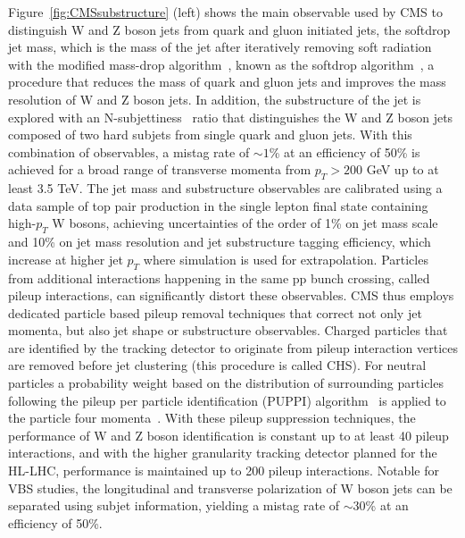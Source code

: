 Figure~\ref{fig:CMSsubstructure} (left) shows the main observable used by CMS to distinguish W and Z boson jets from quark and gluon initiated jets, the softdrop jet mass, which is the mass of the jet after iteratively removing soft radiation with the modified mass-drop algorithm~\cite{Dasgupta:2013ihk,Butterworth:2008iy}, known as the softdrop algorithm~\cite{Larkoski:2014wba}, a procedure that reduces the mass of quark and gluon jets and improves the mass resolution of W and Z boson jets.
In addition, the substructure of the jet is explored with an N-subjettiness~\cite{Thaler:2010tr} ratio that distinguishes the W and Z boson jets composed of two hard subjets from single quark and gluon jets.
With this combination of observables, a mistag rate of $\sim1$\% at an efficiency of 50\% is achieved for a broad range of transverse momenta from $p_T>200$ GeV up to at least 3.5 TeV.
The jet mass and substructure observables are calibrated using a data sample of top pair production in the single lepton final state containing high-$p_T$ W bosons, achieving uncertainties of the order of 1\% on jet mass scale and 10\% on jet mass resolution and jet substructure tagging efficiency, which increase at higher jet $p_T$ where simulation is used for extrapolation.
Particles from additional interactions happening in the same pp bunch crossing, called pileup interactions, can significantly distort these observables.
CMS thus employs dedicated particle based pileup removal techniques that correct not only jet momenta, but also jet shape or substructure observables.
Charged particles that are identified by the tracking detector to originate from pileup interaction vertices are removed before jet clustering (this procedure is called CHS). For neutral particles a probability weight based on the distribution of surrounding particles following the pileup per particle identification (PUPPI) algorithm~\cite{Bertolini:2014bba} is applied to the particle four momenta~\cite{CMS-PAS-JME-14-001}.
With these pileup suppression techniques, the performance of W and Z boson identification is constant up to at least 40 pileup interactions, and with the higher granularity tracking detector planned for the HL-LHC, performance is maintained up to 200 pileup interactions.
Notable for VBS studies, the longitudinal and transverse polarization of W boson jets can be separated using subjet information, yielding a mistag rate of $\sim$30\% at an efficiency of 50\%.

